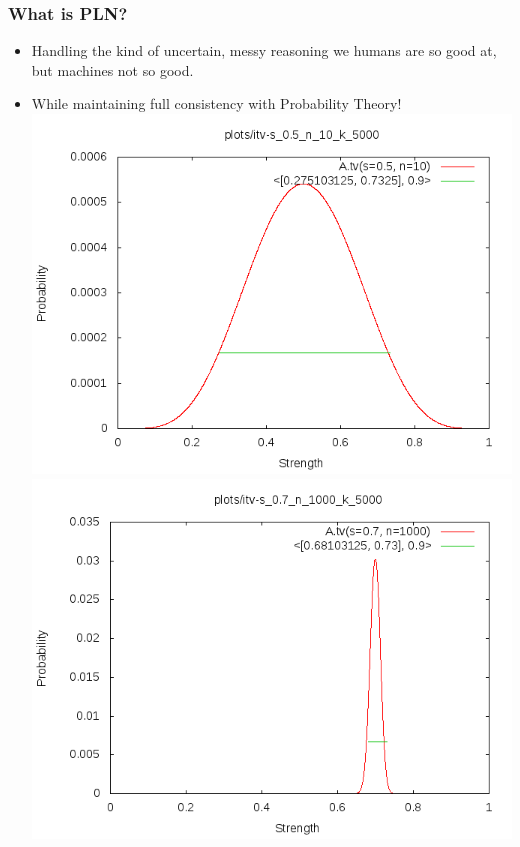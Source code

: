 \documentclass{beamer}
\begin{document}
\frame
{
  \frametitle{What is PLN?}

  \begin{itemize}
  \item Handling the kind of \alert{uncertain, messy reasoning}
    we humans are so good at, but machines not so good.
  \item While maintaining full consistency with
    \alert{Probability Theory}!\\
    \includegraphics[scale=0.3]{dtv-n10.png}
    \includegraphics[scale=0.3]{dtv-n1000.png}
  \end{itemize}
}
\end{document}
